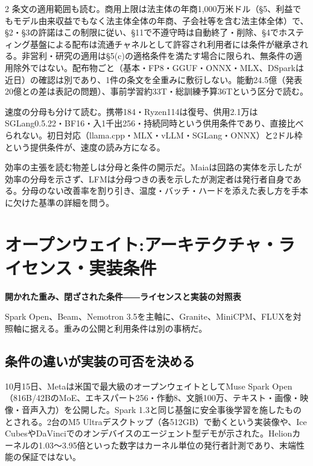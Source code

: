 \documentclass[lualatex,a4paper,10pt]{jlreq}
\begin{document}
\begin{multicols}{2}
条文の適用範囲も読む。商用上限は法主体の年商1,000万米ドル（§5、利益でもモデル由来収益でもなく法主体全体の年商、子会社等を含む法主体全体）で、§2・§3の許諾はこの制限に従い、§11で不遵守時は自動終了・削除、§4でホスティング基盤による配布は流通チャネルとして許容され利用者には条件が継承される。非営利・研究の適用は§5(c)の適格条件を満たす場合に限られ、無条件の適用除外ではない。配布物ごと（基本・FP8・GGUF・ONNX・MLX、DSparkは近日）の確認は別であり、1件の条文を全重みに敷衍しない。能動24.5億（発表20億との差は表記の問題）、事前学習約33T・総訓練予算36Tという区分で読む。
\cite{B11,B69,B12,B90}


速度の分母も分けて読む。携帯184・Ryzen114は復号、供用2.1万はSGLang0.5.22・BF16・入1千出256・持続同時という供用条件であり、直接比べられない。初日対応（llama.cpp・MLX・vLLM・SGLang・ONNX）と2ドル枠という提供条件が、速度の読み方になる。
\cite{B11,B69,B12}


効率の主張を読む物差しは分母と条件の開示だ。Maiaは回路の実体を示したが効率の分母を示さず、LFMは分母つきの表を示したが測定者は発行者自身である。分母のない改善率を割り引き、温度・バッチ・ハードを添えた表し方を手本に欠けた基準の詳細を問う。
\cite{B09,B66,B10,B67,B68,B11,B69,B12}


\section{オープンウェイト:アーキテクチャ・ライセンス・実装条件}
\label{sec:P3}

{\Large\bfseries 開かれた重み、閉ざされた条件――ライセンスと実装の対照表\par}
\smallskip
{\color{SurveyMuted}Spark Open、Beam、Nemotron 3.5を主軸に、Granite、MiniCPM、FLUXを対照軸に据える。重みの公開と利用条件は別の事柄だ。\par}
\bigskip

\subsection*{条件の違いが実装の可否を決める}

10月15日、Metaは米国で最大級のオープンウェイトとしてMuse Spark Open（816B/42BのMoE、エキスパート256・作動8、文脈100万、テキスト・画像・映像・音声入力）を公開した。Spark 1.3と同じ基盤に安全事後学習を施したものとされる。2台のM5 Ultraデスクトップ（各512GB）で動くという実装像や、Ice CubesやDaVinciでのオンデバイスのエージェント型デモが示された。Helionカーネルの1.03〜3.95倍といった数字はカーネル単位の発行者計測であり、末端性能の保証ではない。
\cite{B14,B70,B15,B13,B71}



\end{multicols}
\end{document}
